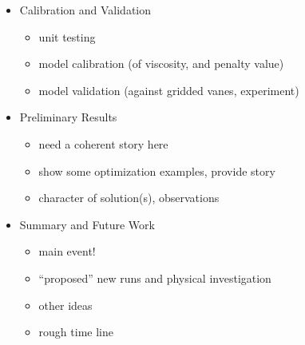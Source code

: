 \documentclass{article}
\begin{document}
\begin{itemize}
 \item Calibration and Validation
       \begin{itemize}
	\item unit testing 
	\item model calibration (of viscosity, and penalty value)
	\item model validation (against gridded vanes, experiment)
       \end{itemize}

 \item Preliminary Results
       \begin{itemize}
        \item need a coherent story here
        \item show some optimization examples, provide story
	\item character of solution(s), observations
       \end{itemize}
 \item Summary and Future Work
       \begin{itemize}
        \item main event!
	\item ``proposed'' new runs and physical investigation
	\item other ideas
	\item rough time line
       \end{itemize}

\end{itemize}
\end{document}
